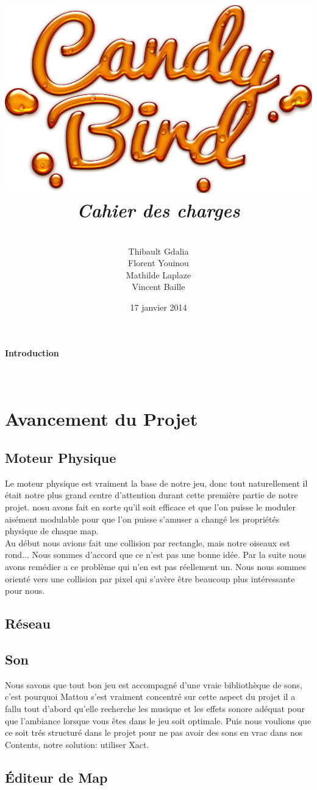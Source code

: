 \documentclass [11pt]{report}
\title{
	\includegraphics[scale=0.43]{images/Logojeu.png}
	 \\\vspace{20mm}
	\textbf{\Huge \itshape Cahier des charges }
	}
\author{ \\\vspace{2mm}
	Thibault Gdalia\\\vspace{2mm}
	Florent Youinou\\\vspace{2mm}
	Mathilde Laplaze\\\vspace{2mm}
	Vincent Baille \\\vspace{30mm}
	}
\date{17 janvier 2014}
\begin{document}
\renewcommand{\baselinestretch}{0.001}
\maketitle
\tableofcontents

\newpage


\textbf{{\Huge Introduction}}\\
\\
\\
\chapter{Avancement du Projet}
	\section{Moteur Physique}
		Le moteur physique est vraiment la base de notre jeu, donc tout naturellement il était notre plus grand centre d'attention durant cette première partie de notre projet. nosu avons fait en sorte qu'il soit efficace et que l'on puisse le moduler aisément modulable pour que l'on puisse s'amuser a changé les propriétés physique de chaque map.\\
		\indent Au début nous avions fait une collision par rectangle, mais notre oiseaux est rond... Nous sommes d'accord que ce n'est pas une bonne idée. Par la suite nous avons remédier a ce problème qui n'en est pas réellement un. Nous nous sommes orienté vers une collision par pixel qui s'avère être beaucoup plus intéressante pour nous.
	\section{Réseau}

	\section{Son}
	Nous savons que tout bon jeu est accompagné d'une vraie bibliothèque de sons, c'est pourquoi Mattou s'est vraiment concentré sur cette aspect du projet il a fallu tout d'abord qu'elle recherche les musique et les effets sonore adéquat pour que l'ambiance lorsque vous êtes dans le jeu soit optimale. Puis nous voulions que ce soit trés structuré dans le projet pour ne pas avoir des sons en vrac dans nos Contents, notre solution: utiliser Xact. 
	\section{\'Editeur de Map}
\end{document}
